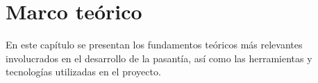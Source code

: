 \chapter{Marco teórico} \label{chap:marco_teorico}

\vspace{5 mm}

En este capítulo se presentan los fundamentos teóricos más relevantes involucrados en el desarrollo de la pasantía, así como las herramientas y tecnologías utilizadas en el proyecto.